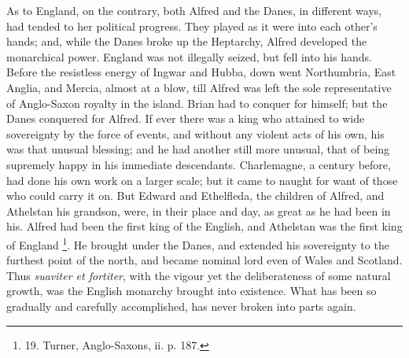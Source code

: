 As to England, on the
contrary, both Alfred and the Danes, in different ways, had tended to
her political progress. They played as it were into each other's
hands; and, while the Danes broke up the Heptarchy, Alfred developed
the monarchical power. England was not illegally seized, but fell into
his hands. Before the resistless energy of Ingwar and Hubba, down went
Northumbria, East Anglia, and Mercia, almost at a blow, till Alfred
was left the sole representative of Anglo-Saxon royalty in the island.
Brian had to conquer for himself; but the Danes conquered for Alfred.
If ever there was a king who attained to wide sovereignty by the force
of events, and without any violent acts of his own, his was that
unusual blessing; and he had another still more unusual, that of being
supremely happy in his immediate descendants. Charlemagne, a century
before, had done his own work on a larger scale; but it came to naught
for want of those who could carry it on. But Edward and Ethelfleda,
the children of Alfred, and Athelstan his grandson, were, in their
place and day, as great as he had been in his. Alfred had been the
first king of the English, and Athelstan was the first king of England
\footnote{19.
Turner, Anglo-Saxons, ii. p. 187.}. He brought under the
Danes, and extended his sovereignty to the furthest point of the
north, and became nominal lord even of Wales and Scotland. Thus \emph{suaviter
et fortiter}, with the vigour yet the deliberateness of some
natural growth, was the English monarchy brought into existence. What
has been so gradually and carefully accomplished, has never broken
into parts again.

